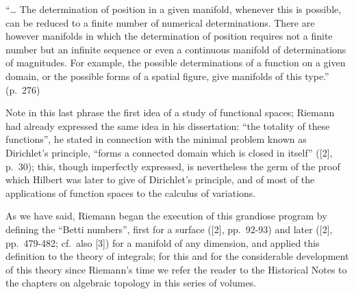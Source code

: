 ``\ldots{} The determination of position in a given manifold, whenever this is possible, can be reduced to a finite number of numerical determinations. There are however manifolds in which the determination of position requires not a finite number but an infinite sequence or even a continuous manifold of determinations of magnitudes. For example, the possible determinations of a function on a given domain, or the possible forms of a spatial figure, give manifolds of this type.'' (p.~276)

Note in this last phrase the first idea of a study of functional spaces; Riemann had already expressed the same idea in his dissertation: ``the totality of these functions'', he stated in connection with the minimal problem known as Dirichlet's principle, ``forms a connected domain which is closed in itself'' ({[}2{]}, p.~30); this, though imperfectly expressed, is nevertheless the germ of the proof which Hilbert was later to give of Dirichlet's principle, and of most of the applications of function spaces to the calculus of variations.

As we have said, Riemann began the execution of this grandiose program by defining the ``Betti numbers'', first for a surface ({[}2{]}, pp.~92-93) and later ({[}2{]}, pp.~479-482; cf.~also {[}3{]}) for a manifold of any dimension, and applied this definition to the theory of integrals; for this and for the considerable development of this theory since Riemann's time we refer the reader to the Historical Notes to the chapters on algebraic topology in this series of volumes.


